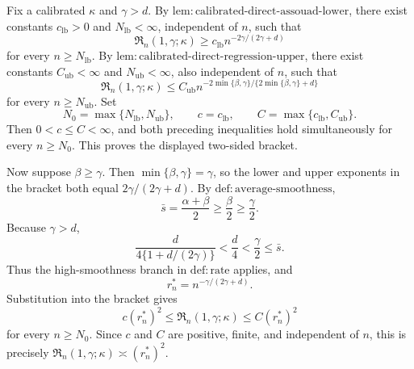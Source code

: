 Fix a calibrated \(\kappa\) and \(\gamma>d\). By \(\mathrm{lem:calibrated\text{-}direct\text{-}assouad\text{-}lower}\), there exist constants \(c_{\mathrm{lb}}>0\) and \(N_{\mathrm{lb}}<\infty\), independent of \(n\), such that
\[
\mathfrak R_n(1,\gamma;\kappa)\ge c_{\mathrm{lb}}n^{-2\gamma/(2\gamma+d)}
\]
for every \(n\ge N_{\mathrm{lb}}\). By \(\mathrm{lem:calibrated\text{-}direct\text{-}regression\text{-}upper}\), there exist constants \(C_{\mathrm{ub}}<\infty\) and \(N_{\mathrm{ub}}<\infty\), also independent of \(n\), such that
\[
\mathfrak R_n(1,\gamma;\kappa)
\le C_{\mathrm{ub}}n^{-2\min\{\beta,\gamma\}/\{2\min\{\beta,\gamma\}+d\}}
\]
for every \(n\ge N_{\mathrm{ub}}\). Set
\[
N_0=\max\{N_{\mathrm{lb}},N_{\mathrm{ub}}\},
\qquad c=c_{\mathrm{lb}},
\qquad C=\max\{c_{\mathrm{lb}},C_{\mathrm{ub}}\}.
\]
Then \(0<c\le C<\infty\), and both preceding inequalities hold simultaneously for every \(n\ge N_0\). This proves the displayed two-sided bracket.

Now suppose \(\beta\ge\gamma\). Then \(\min\{\beta,\gamma\}=\gamma\), so the lower and upper exponents in the bracket both equal \(2\gamma/(2\gamma+d)\). By \(\mathrm{def:average\text{-}smoothness}\),
\[
\bar s=\frac{\alpha+\beta}{2}\ge\frac{\beta}{2}\ge\frac{\gamma}{2}.
\]
Because \(\gamma>d\),
\[
\frac{d}{4\{1+d/(2\gamma)\}}<\frac d4<\frac\gamma2\le\bar s.
\]
Thus the high-smoothness branch in \(\mathrm{def:rate}\) applies, and
\[
r_n^*=n^{-\gamma/(2\gamma+d)}.
\]
Substitution into the bracket gives
\[
c(r_n^*)^2
\le\mathfrak R_n(1,\gamma;\kappa)
\le C(r_n^*)^2
\]
for every \(n\ge N_0\). Since \(c\) and \(C\) are positive, finite, and independent of \(n\), this is precisely \(\mathfrak R_n(1,\gamma;\kappa)\asymp(r_n^*)^2\).